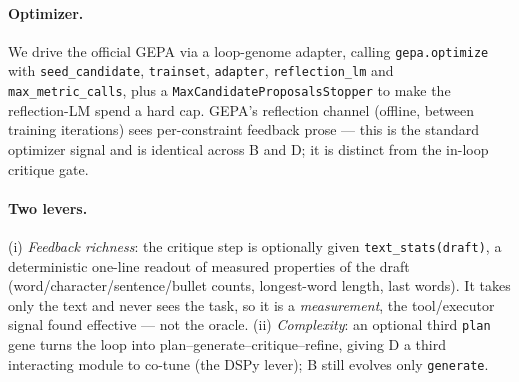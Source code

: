 \documentclass[11pt]{article}
\begin{document}
\paragraph{Optimizer.}
We drive the official GEPA \citep{agrawal2025gepa} via a loop-genome adapter, calling
\texttt{gepa.optimize} with \texttt{seed\_candidate}, \texttt{trainset}, \texttt{adapter},
\texttt{reflection\_lm} and \texttt{max\_metric\_calls}, plus a
\texttt{MaxCandidateProposalsStopper} to make the reflection-LM spend a hard cap. GEPA's reflection channel (offline, between
training iterations) sees per-constraint feedback prose --- this is the standard
optimizer signal and is identical across B and D; it is distinct from the
in-loop critique gate.

\paragraph{Two levers.}
(i) \emph{Feedback richness}: the critique step is optionally given
\texttt{text\_stats(draft)}, a deterministic one-line readout of measured
properties of the draft (word/character/sentence/bullet counts, longest-word
length, last words). It takes only the text and never sees the task, so it is a
\emph{measurement}, the tool/executor signal \citep{huang2023cannot} found
effective --- not the oracle. (ii) \emph{Complexity}: an optional third
\texttt{plan} gene turns the loop into plan--generate--critique--refine, giving
D a third interacting module to co-tune (the DSPy lever); B still evolves only
\texttt{generate}.
\end{document}
